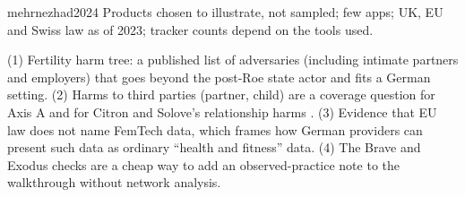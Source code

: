 \begin{papercard}{mehrnezhad2024}
 Products chosen to illustrate, not sampled; few apps; UK, EU and Swiss law as of 2023; tracker counts depend on the tools used.

 (1) Fertility harm tree: a published list of adversaries (including intimate partners and employers) that goes beyond the post-Roe state actor and fits a German setting. (2) Harms to third parties (partner, child) are a coverage question for Axis A and for Citron and Solove's relationship harms . (3) Evidence that EU law does not name FemTech data, which frames how German providers can present such data as ordinary ``health and fitness'' data. (4) The Brave and Exodus checks are a cheap way to add an observed-practice note to the walkthrough without network analysis.
\end{papercard}

